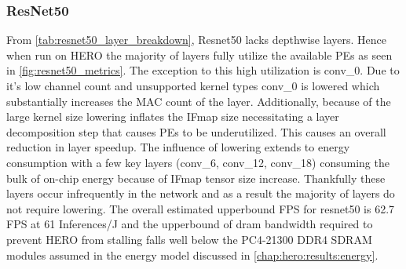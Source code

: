 \subsubsection{ResNet50}

From \autoref{tab:resnet50_layer_breakdown}, Resnet50 lacks depthwise layers.
Hence when run on HERO the majority of layers fully utilize the available PEs as
seen in \autoref{fig:resnet50_metrics}. The exception to
this high utilization is conv\_0. Due to it's low channel count and unsupported
kernel types conv\_0 is lowered which substantially increases the MAC count of
the layer. Additionally, because of the large kernel size lowering inflates the
IFmap size necessitating a layer decomposition step that causes PEs to be
underutilized. This causes an overall reduction in layer speedup. The influence
of lowering extends to energy consumption with a few key layers (conv\_6,
conv\_12, conv\_18) consuming the bulk of on-chip energy because of IFmap tensor
size increase. Thankfully these layers occur infrequently in the network and as
a result the majority of layers do not require lowering. The overall estimated
upperbound FPS for resnet50 is 62.7 FPS at 61 Inferences/J and the upperbound of
dram bandwidth required to prevent HERO from stalling falls well below the
PC4-21300 DDR4 SDRAM modules assumed in the energy model discussed in
\autoref{chap:hero:results:energy}. 

